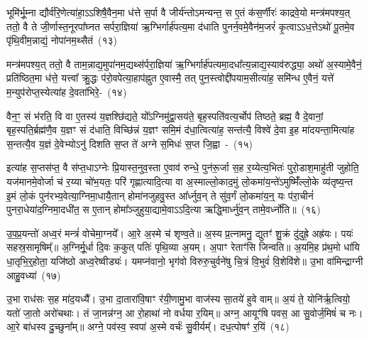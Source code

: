 भूमि॑र्भू॒म्ना द्यौर्व॑रि॒णेत्या॑हा॒\-ऽऽ\-शिषै॒वैन॒मा ध॑त्ते स॒र्पा वै जीर्य॑न्तो\-ऽमन्यन्त॒ स ए॒तं क॑स॒र्णीरः॑ काद्रवे॒यो मन्त्र॑मपश्य॒त् ततो॒ वै ते जी॒र्णास्त॒नूरपा᳚घ्नत सर्परा॒ज्ञिया॑ ऋ॒ग्भिर्गार्\mbox{}ह॑पत्य॒मा द॑धाति पुनर्न॒वमे॒वैन॑म॒जरं॑ कृ॒त्वा\-ऽऽ\-ध॒त्ते\-ऽथो॑ पू॒तमे॒व पृ॑थि॒वीम॒न्नाद्यं॒ नोपा॑नम॒थ्सैतं~(१३)\ip

मन्त्र॑मपश्य॒त् ततो॒ वै ताम॒न्नाद्य॒मुपा॑\-नम॒द्यथ्स॑र्परा॒ज्ञिया॑ ऋ॒ग्भिर्गार्\mbox{}ह॑पत्यमा॒दधा᳚त्य॒न्ना\-द्य॒स्या\-व॑रुद्ध्या॒ अथो॑ अ॒स्यामे॒वैनं॒ प्रति॑ष्ठित॒मा ध॑त्ते॒ यत्त्वा᳚ क्रु॒द्धः प॑रो॒वपेत्या॒हाप॑ह्नुत ए॒वास्मै॒ तत् पुन॒स्त्वोद्दी॑पयाम॒सीत्या॑ह॒ समि॑न्ध ए॒वैनं॒ यत्ते॑ म॒न्युप॑रोप्त॒स्येत्या॑ह दे॒वता॑भिरे॒-~(१४)\ip

वैन॒ꣳ॒ सं भ॑रति॒ वि वा ए॒तस्य॑ य॒ज्ञश्छि॑द्यते॒ यो᳚\-ऽग्निमु॑द्वा॒सय॑ते॒ बृह॒स्पति॑वत्य॒र्चोप॑ तिष्ठते॒ ब्रह्म॒ वै दे॒वानां॒ बृह॒स्पति॒र्ब्रह्म॑णै॒व य॒ज्ञꣳ सं द॑धाति॒ विच्छि॑न्नं य॒ज्ञꣳ समि॒मं द॑धा॒त्वित्या॑ह॒ सन्त॑त्यै॒ विश्वे॑ दे॒वा इ॒ह मा॑दयन्ता॒मित्या॑ह स॒न्तत्यै॒व य॒ज्ञं दे॒वेभ्यो\-ऽनु॑ दिशति स॒प्त ते॑ अग्ने स॒मिधः॑ स॒प्त जि॒ह्वा~-~(१५)\ip

इत्या॑ह स॒प्तस॑प्त॒ वै स॑प्त॒धा\-ऽग्नेः प्रि॒यास्त॒नुव॒स्ता ए॒वाव॑ रुन्धे॒ पुन॑रू॒र्जा स॒ह र॒य्येत्य॒भितः॑ पुरो॒डाश॒माहु॑ती जुहोति॒ यज॑मानमे॒वोर्जा च॑ र॒य्या चो॑भ॒यतः॒ परि॑ गृह्णात्यादि॒त्या वा अ॒स्माल्लो॒काद॒मुं लो॒कमा॑य॒न्ते॑\-ऽमुष्मिँ॑ल्लो॒के व्य॑तृष्य॒न्त इ॒मं लो॒कं पुन॑रभ्य॒\-वेत्या॒ग्नि\-मा॒धायै॒तान् होमा॑नजुहवु॒स्त आ᳚र्ध्नुव॒न् ते सु॑व॒र्गं लो॒कमा॑य॒न्॒ यः प॑रा॒चीनं॑ पुनरा॒धेया॑द॒ग्निमा॒दधी॑त॒ स ए॒तान् होमा᳚ञ्जुहुया॒द्यामे॒वा\-ऽऽ\-दि॒त्या ऋद्धि॒मार्ध्नु॑व॒न् तामे॒वर्ध्नो॑ति॥~(१६)\ip

{\anuvakamend[{ए॒तमे॒व जि॒ह्वा ए॒तान् पञ्च॑विꣳशतिश्च}]}

उ॒प॒प्र॒यन्तो॑ अध्व॒रं मन्त्रं॑ वोचेमा॒ग्नये᳚। आ॒रे अ॒स्मे च॑ शृण्व॒ते॥ अ॒स्य प्र॒त्नामनु॒ द्युतꣳ॑ शु॒क्रं दु॑दुह्रे॒ अह्र॑यः। पयः॑ सहस्र॒सामृषिम्᳚॥ अ॒ग्निर्मू॒र्धा दि॒वः क॒कुत् पतिः॑ पृथि॒व्या अ॒यम्। अ॒पाꣳ रेताꣳ॑सि जिन्वति॥ अ॒यमि॒ह प्र॑थ॒मो धा॑यि धा॒तृभि॒र्॒\mbox{}होता॒ यजि॑ष्ठो अध्व॒रेष्वीड्यः॑। यमप्न॑वानो॒ भृग॑वो विरुरु॒चुर्वने॑षु चि॒त्रं वि॒भुवं॑ वि॒शेवि॑शे॥ उ॒भा वा॑मिन्द्राग्नी आहु॒वध्या॑~(१७)\ip

उ॒भा राध॑सः स॒ह मा॑द॒यध्यै᳚। उ॒भा दा॒तारा॑वि॒षाꣳ र॑यी॒णामु॒भा वाज॑स्य सा॒तये॑ हुवे वाम्॥ अ॒यं ते॒ योनि॑र्\mbox{}ऋ॒त्वियो॒ यतो॑ जा॒तो अरो॑चथाः। तं जा॒नन्न॑ग्न॒ आ रो॒हाथा॑ नो वर्धया र॒यिम्॥ अग्न॒ आयूꣳ॑षि पवस॒ आ सु॒वोर्ज॒मिषं॑ च नः। आ॒रे बा॑धस्व दु॒च्छुना᳚म्॥ अग्ने॒ पव॑स्व॒ स्वपा॑ अ॒स्मे वर्चः॑ सु॒वीर्यम्᳚। दध॒त्पोषꣳ॑ र॒यिं~(१८)\ip

